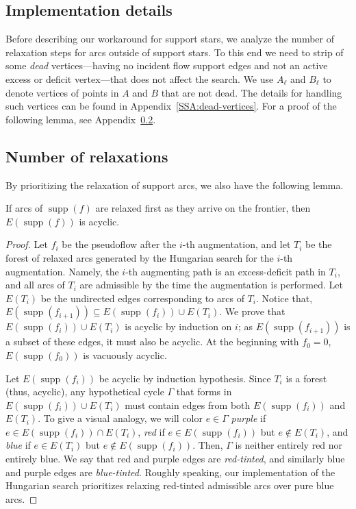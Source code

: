 \documentclass[a4paper,UKenglish]{socg-lipics-v2018}
\def\etal{\emph{et~al.}}
\def\etal{\textit{et~al.}}
\def\supp{\operatorname{supp}}
\theoremstyle{plain}
\numberwithin{figure}{section}
\def\EMPH#1{\textcolor{BrickRed}{{\emph{#1}}}}
\begin{document}
\subsection{Implementation details}

Before describing our workaround for support stars, we analyze the number of
relaxation steps for arcs outside of support stars.
To this end we need to strip of some \EMPH{dead} vertices---having no incident flow support edges and not an active excess or deficit vertex---that does not affect the search.
We use \EMPH{$A_\ell$} and \EMPH{$B_\ell$} to denote vertices of points in $A$ and $B$ that are not dead.
The details for handling such vertices can be found in Appendix~\ref{SSA:dead-vertices}.
%
For a proof of the following lemma, see Appendix~\ref{SSA:relax-outside-stars}.

\begin{toappendix}
\subsection{Number of relaxations}
\label{SSA:relax-outside-stars}

By prioritizing the relaxation of support arcs, we also have the following
lemma.

\begin{lemmarep}[(Agarwal~\etal~\cite{AFPVX17})]
\label{lemma:orlin_acyclic}
If arcs of $\supp(f)$ are relaxed first as they arrive on the frontier, then
$E(\supp(f))$ is acyclic.
\end{lemmarep}

\begin{proof}
Let $f_i$ be the pseudoflow after the $i$-th augmentation, and let $T_i$ be the
forest of relaxed arcs generated by the Hungarian search for the $i$-th
augmentation.
Namely, the $i$-th augmenting path is an excess-deficit path in $T_i$, and all
arcs of $T_i$ are admissible by the time the augmentation is performed.
Let $E(T_i)$ be the undirected edges corresponding to arcs of $T_i$.
Notice that, $E(\supp(f_{i+1})) \subseteq E(\supp(f_i)) \cup E(T_i)$.
We prove that $E(\supp(f_i)) \cup E(T_i)$ is acyclic by induction on $i$;
as $E(\supp(f_{i+1}))$ is a subset of these edges, it must also be acyclic.
At the beginning with $f_0 = 0$, $E(\supp(f_0))$ is vacuously acyclic.

Let $E(\supp(f_i))$ be acyclic by induction hypothesis.
Since $T_i$ is a forest (thus, acyclic), any hypothetical cycle $\Gamma$ that
forms in $E(\supp(f_i)) \cup E(T_i)$ must contain edges from both
$E(\supp(f_i))$ and $E(T_i)$.
To give a visual analogy, we will color $e \in \Gamma$
\EMPH{purple} if $e \in E(\supp(f_i)) \cap E(T_i)$,
\EMPH{red} if $e \in E(\supp(f_i))$ but $e \not\in E(T_i)$,
and \EMPH{blue} if $e \in E(T_i)$ but $e \not\in E(\supp(f_i))$.
Then, $\Gamma$ is neither entirely red nor entirely blue.
We say that red and purple edges are \EMPH{red-tinted}, and similarly blue and
purple edges are \EMPH{blue-tinted}.
Roughly speaking, our implementation of the Hungarian search prioritizes
relaxing red-tinted admissible arcs over pure blue arcs. %


\end{proof}
\end{toappendix}
\end{document}
